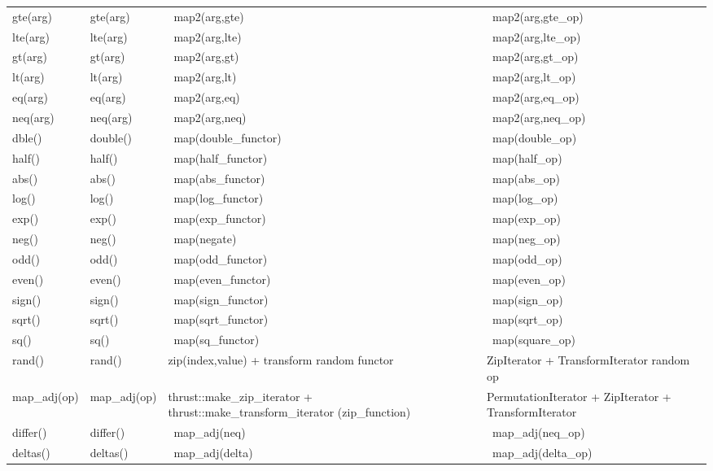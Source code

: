 \documentclass[10pt]{article}
\newcommand{\parrotemoji}{{\emojifont\normalsize\symbol{"1F99C}}}
\newcommand{\parrotimpl}{\parrotemoji}
\begin{document}
\begin{minipage}{\textwidth}
\begin{tabularx}{\textwidth}{ll>{\raggedright\arraybackslash}X>{\raggedright\arraybackslash}X}
gte(arg) & gte(arg) & \parrotimpl\ map2(arg,gte) & \parrotimpl\ map2(arg,gte\_op) \\
lte(arg) & lte(arg) & \parrotimpl\ map2(arg,lte) & \parrotimpl\ map2(arg,lte\_op) \\
gt(arg) & gt(arg) & \parrotimpl\ map2(arg,gt) & \parrotimpl\ map2(arg,gt\_op) \\
lt(arg) & lt(arg) & \parrotimpl\ map2(arg,lt) & \parrotimpl\ map2(arg,lt\_op) \\
eq(arg) & eq(arg) & \parrotimpl\ map2(arg,eq) & \parrotimpl\ map2(arg,eq\_op) \\
neq(arg) & neq(arg) & \parrotimpl\ map2(arg,neq) & \parrotimpl\ map2(arg,neq\_op) \\
dble() & double() & \parrotimpl\ map(double\_functor) & \parrotimpl\ map(double\_op) \\
half() & half() & \parrotimpl\ map(half\_functor) & \parrotimpl\ map(half\_op) \\
abs() & abs() & \parrotimpl\ map(abs\_functor) & \parrotimpl\ map(abs\_op) \\
log() & log() & \parrotimpl\ map(log\_functor) & \parrotimpl\ map(log\_op) \\
exp() & exp() & \parrotimpl\ map(exp\_functor) & \parrotimpl\ map(exp\_op) \\
neg() & neg() & \parrotimpl\ map(negate) & \parrotimpl\ map(neg\_op) \\
odd() & odd() & \parrotimpl\ map(odd\_functor) & \parrotimpl\ map(odd\_op) \\
even() & even() & \parrotimpl\ map(even\_functor) & \parrotimpl\ map(even\_op) \\
sign() & sign() & \parrotimpl\ map(sign\_functor) & \parrotimpl\ map(sign\_op) \\
sqrt() & sqrt() & \parrotimpl\ map(sqrt\_functor) & \parrotimpl\ map(sqrt\_op) \\
sq() & sq() & \parrotimpl\ map(sq\_functor) & \parrotimpl\ map(square\_op) \\
rand() & rand() & zip(index,value) + transform random functor & ZipIterator + TransformIterator random op \\
map\_adj(op) & map\_adj(op) & thrust::make\_zip\_iterator + thrust::make\_transform\_iterator (zip\_function) & PermutationIterator + ZipIterator + TransformIterator \\
differ() & differ() & \parrotimpl\ map\_adj(neq) & \parrotimpl\ map\_adj(neq\_op) \\
deltas() & deltas() & \parrotimpl\ map\_adj(delta) & \parrotimpl\ map\_adj(delta\_op) \\

\end{tabularx}
\end{minipage}
\end{document}
